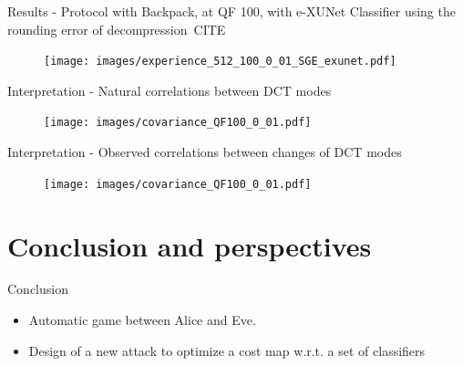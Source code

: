 \documentclass[10pt]{beamer}
\begin{document}
\begin{frame}{Results - Protocol with Backpack, at QF 100, with e-XUNet}
Classifier using the rounding error of decompression~CITE
    \begin{figure}[h]
        \texttt{[image: images/experience\_512\_100\_0\_01\_SGE\_exunet.pdf]}
    \end{figure}
\end{frame}


\begin{frame}{Interpretation - Natural correlations between DCT modes}
    \begin{figure}[h]
        \texttt{[image: images/covariance\_QF100\_0\_01.pdf]}
    \end{figure}
\end{frame}


\begin{frame}{Interpretation - Observed correlations between changes of DCT modes}
    \begin{figure}[h]
        \texttt{[image: images/covariance\_QF100\_0\_01.pdf]}
    \end{figure}
\end{frame}


\section{Conclusion and perspectives}


\begin{frame}{Conclusion}
    \begin{itemize}
        \item Automatic game between Alice and Eve. 
        \pause
        \item Design of a new attack to optimize a cost map w.r.t. a set of classifiers

    \end{itemize}

\end{frame}
\end{document}
